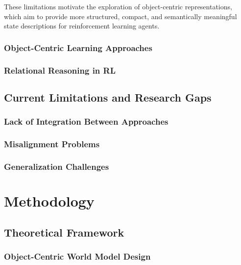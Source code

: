 \documentclass[
	english,
	ruledheaders=section,
	class=report,
	thesis={type=master},
	accentcolor=9c,
	custommargins=true,
	marginpar=false,
	parskip=half-,
	fontsize=11pt,
]{tudapub}
\begin{document}
These limitations motivate the exploration of object-centric representations, which aim to provide more structured, compact, and semantically meaningful state descriptions for reinforcement learning agents.

\subsection{Object-Centric Learning Approaches}
\label{subsec:oc_approaches}

\subsection{Relational Reasoning in RL}
\label{subsec:relational_reasoning}

\section{Current Limitations and Research Gaps}
\label{sec:limitations}

\subsection{Lack of Integration Between Approaches}
\label{subsec:integration_gap}

\subsection{Misalignment Problems}
\label{subsec:misalignment}

\subsection{Generalization Challenges}
\label{subsec:gen_challenges}

\chapter{Methodology}
\label{chap:methodology}

\section{Theoretical Framework}
\label{sec:framework}

\subsection{Object-Centric World Model Design}
\label{subsec:oc_world_model}
\end{document}
